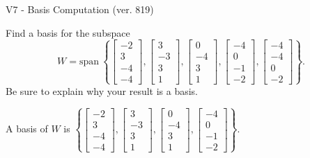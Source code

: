 \begin{exercise}
  \begin{exerciseTitle}V7 - Basis Computation (ver. 819)\end{exerciseTitle}
  \begin{exerciseStatement}
    Find a basis for the subspace 
\[W=\mathrm{span}\ \left\{\left[\begin{array}{r}
-2 \\
3 \\
-4 \\
-4
\end{array}\right] , \left[\begin{array}{r}
3 \\
-3 \\
3 \\
1
\end{array}\right] , \left[\begin{array}{r}
0 \\
-4 \\
3 \\
1
\end{array}\right] , \left[\begin{array}{r}
-4 \\
0 \\
-1 \\
-2
\end{array}\right] , \left[\begin{array}{r}
-4 \\
-4 \\
0 \\
-2
\end{array}\right]\right\}.\]
 Be sure to explain why your result is a basis.


  \end{exerciseStatement}
  \begin{exerciseAnswer}
   A basis of \(W\) is  \(\left\{\left[\begin{array}{r}
-2 \\
3 \\
-4 \\
-4
\end{array}\right] , \left[\begin{array}{r}
3 \\
-3 \\
3 \\
1
\end{array}\right] , \left[\begin{array}{r}
0 \\
-4 \\
3 \\
1
\end{array}\right] , \left[\begin{array}{r}
-4 \\
0 \\
-1 \\
-2
\end{array}\right]\right\}\).
  


  \end{exerciseAnswer}
\end{exercise}